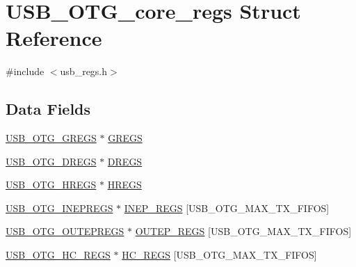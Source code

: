 \hypertarget{struct_u_s_b___o_t_g__core__regs}{\section{U\-S\-B\-\_\-\-O\-T\-G\-\_\-core\-\_\-regs Struct Reference}
\label{struct_u_s_b___o_t_g__core__regs}
}


{\ttfamily \#include $<$usb\-\_\-regs.\-h$>$}

\subsection*{Data Fields}
\begin{DoxyCompactItemize}
\item 
\hyperlink{group_______u_s_b___o_t_g___core__register_ga726f86373d99c6ac3a1d9eff0f08d96e}{U\-S\-B\-\_\-\-O\-T\-G\-\_\-\-G\-R\-E\-G\-S} $\ast$ \hyperlink{group___u_s_b___o_t_g___d_r_i_v_e_r_gacc851a3b405cd504963dc080bea312b6}{G\-R\-E\-G\-S}
\item 
\hyperlink{group______device___registers_gad6421c23a43e84eb179f543a1cd3c04c}{U\-S\-B\-\_\-\-O\-T\-G\-\_\-\-D\-R\-E\-G\-S} $\ast$ \hyperlink{group___u_s_b___o_t_g___d_r_i_v_e_r_ga35f5af507074b23c0c181f6f7a6a7c19}{D\-R\-E\-G\-S}
\item 
\hyperlink{group_______host___mode___register___structures_ga5857dffb767c8009dc294a308941d078}{U\-S\-B\-\_\-\-O\-T\-G\-\_\-\-H\-R\-E\-G\-S} $\ast$ \hyperlink{group___u_s_b___o_t_g___d_r_i_v_e_r_ga7497119e5a74fdef8ec73e62ffa9f689}{H\-R\-E\-G\-S}
\item 
\hyperlink{group_______i_n___endpoint-_specific___register_ga31786dae3bf9816d3e69f67559bb1499}{U\-S\-B\-\_\-\-O\-T\-G\-\_\-\-I\-N\-E\-P\-R\-E\-G\-S} $\ast$ \hyperlink{group___u_s_b___o_t_g___d_r_i_v_e_r_ga4a6860a408abdfef555d0e4d036375cf}{I\-N\-E\-P\-\_\-\-R\-E\-G\-S} \mbox{[}U\-S\-B\-\_\-\-O\-T\-G\-\_\-\-M\-A\-X\-\_\-\-T\-X\-\_\-\-F\-I\-F\-O\-S\mbox{]}
\item 
\hyperlink{group_______o_u_t___endpoint-_specific___registers_ga5247fff61d820ab0db3e6d8df0441a03}{U\-S\-B\-\_\-\-O\-T\-G\-\_\-\-O\-U\-T\-E\-P\-R\-E\-G\-S} $\ast$ \hyperlink{group___u_s_b___o_t_g___d_r_i_v_e_r_ga260fda7483480de26837c4ed6740e136}{O\-U\-T\-E\-P\-\_\-\-R\-E\-G\-S} \mbox{[}U\-S\-B\-\_\-\-O\-T\-G\-\_\-\-M\-A\-X\-\_\-\-T\-X\-\_\-\-F\-I\-F\-O\-S\mbox{]}
\item 
\hyperlink{group_______host___channel___specific___registers_ga1b123aa3d1b9476eab8957c17af482b0}{U\-S\-B\-\_\-\-O\-T\-G\-\_\-\-H\-C\-\_\-\-R\-E\-G\-S} $\ast$ \hyperlink{group___u_s_b___o_t_g___d_r_i_v_e_r_ga567f296640c8bb116e430b37e6f0e279}{H\-C\-\_\-\-R\-E\-G\-S} \mbox{[}U\-S\-B\-\_\-\-O\-T\-G\-\_\-\-M\-A\-X\-\_\-\-T\-X\-\_\-\-F\-I\-F\-O\-S\mbox{]}

\end{DoxyCompactItemize}
